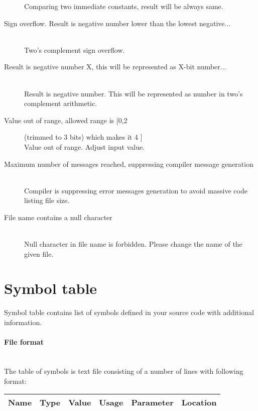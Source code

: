 \begin{description}
                Comparing two immediate constants, result will be always same.
            \item[Sign overflow. Result is negative number lower than the lowest negative...]~\\
                Two's complement sign overflow.
            \item[Result is negative number X, this will be represented as X-bit number...]~\\
                Result is negative number. This will be represented as number in two's complement arithmetic.
            \item[Value out of range, allowed range is [0,2] (trimmed to 3 bits) which makes it 4 ]~\\
                Value out of range. Adjust input value.
            \item[Maximum number of messages reached, suppressing compiler message generation ]~\\
                Compiler is suppressing error messages generation to avoid massive code listing file size.
            \item[File name contains a null character ]~\\
                Null character in file name is forbidden. Please change the name of the given file.
        \end{description}

\section{Symbol table}
    Symbol table contains list of symbols defined in your source code with additional information.

    \paragraph{File format}
        ~\\
        The table of symbols is text file consisting of a number of lines with following format:\\
        \begin{tabular}{|cccccc|}
            \hline
            Name & Type & Value & Usage & Parameter & Location \\
            \hline
        \end{tabular}

